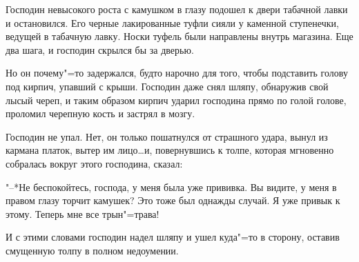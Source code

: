 
Господин  невысокого роста с камушком  в
глазу подошел к двери табачной лавки и остановился. Его черные лакированные туфли сияли
у каменной ступенечки,  ведущей  в  табачную
лавку. Носки туфель были  направлены  внутрь
магазина.  Еще два шага,  и господин скрылся
бы за дверью.
    
Но он почему"=то задержался, будто нарочно  для  того,  чтобы подставить голову  под
кирпич, упавший с крыши.  Господин даже снял
шляпу, обнаружив свой лысый череп,  и  таким
образом кирпич ударил господина прямо по голой голове,  проломил черепную кость и застрял в мозгу.
    
Господин не упал.  Нет, он только пошатнулся от страшного удара,  вынул из  кармана
платок, вытер им лицо\dots  и,  повернувшись к
толпе,  которая мгновенно  собралась  вокруг
этого господина, сказал:
    
"--*Не беспокойтесь, господа,  у меня была
уже  прививка.  Вы видите,  у меня в  правом
глазу торчит камушек?  Это тоже был  однажды
случай. Я уже привык к этому. Теперь мне все
трын"=трава!
    
И с этими словами господин надел шляпу и
ушел  куда"=то  в сторону, оставив  смущенную
толпу в полном недоумении.
